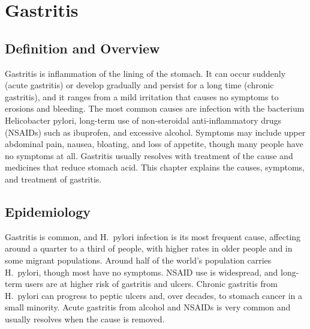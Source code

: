 \chapter{Gastritis}

\section*{Definition and Overview}
Gastritis is inflammation of the lining of the stomach. It can occur suddenly (acute gastritis) or develop gradually and persist for a long time (chronic gastritis), and it ranges from a mild irritation that causes no symptoms to erosions and bleeding. The most common causes are infection with the bacterium Helicobacter pylori, long-term use of non-steroidal anti-inflammatory drugs (NSAIDs) such as ibuprofen, and excessive alcohol. Symptoms may include upper abdominal pain, nausea, bloating, and loss of appetite, though many people have no symptoms at all. Gastritis usually resolves with treatment of the cause and medicines that reduce stomach acid. This chapter explains the causes, symptoms, and treatment of gastritis.

\section*{Epidemiology}
Gastritis is common, and H.\ pylori infection is its most frequent cause, affecting around a quarter to a third of people, with higher rates in older people and in some migrant populations. Around half of the world's population carries H.\ pylori, though most have no symptoms. NSAID use is widespread, and long-term users are at higher risk of gastritis and ulcers. Chronic gastritis from H.\ pylori can progress to peptic ulcers and, over decades, to stomach cancer in a small minority. Acute gastritis from alcohol and NSAIDs is very common and usually resolves when the cause is removed.


